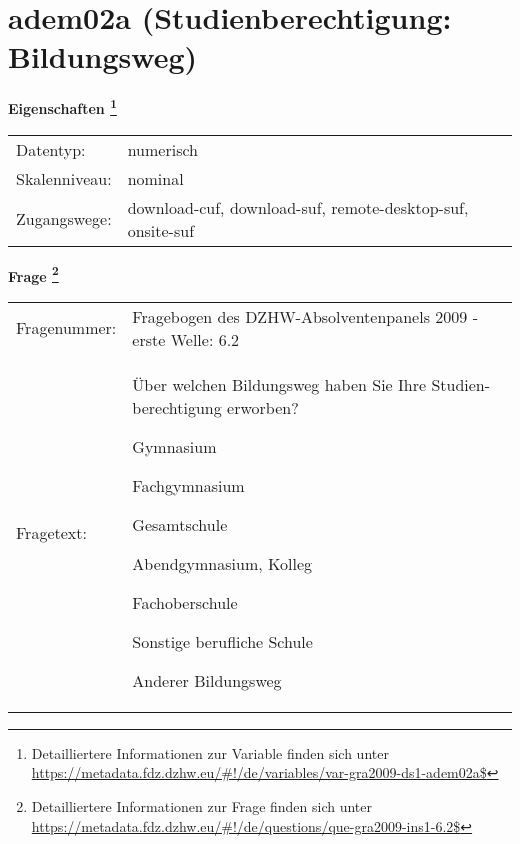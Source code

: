 
    \setcounter{footnote}{0}

    \vspace*{-1.8cm}
	\section{adem02a (Studienberechtigung: Bildungsweg)}
	\label{section:adem02a}



    \vspace*{0.5cm}
    \noindent\textbf{Eigenschaften
	\footnote{Detailliertere Informationen zur Variable finden sich unter
		\url{https://metadata.fdz.dzhw.eu/\#!/de/variables/var-gra2009-ds1-adem02a$}}}\\
	\begin{tabularx}{\hsize}{@{}lX}
	Datentyp: & numerisch \\
	Skalenniveau: & nominal \\
	Zugangswege: &
	  download-cuf, 
	  download-suf, 
	  remote-desktop-suf, 
	  onsite-suf
 \\
    \end{tabularx}



				\vspace*{0.5cm}
                \noindent\textbf{Frage
	                \footnote{Detailliertere Informationen zur Frage finden sich unter
		              \url{https://metadata.fdz.dzhw.eu/\#!/de/questions/que-gra2009-ins1-6.2$}}}\\
				\begin{tabularx}{\hsize}{@{}lX}
					Fragenummer: &
					  Fragebogen des DZHW-Absolventenpanels 2009 - erste Welle:
					  6.2
 \\
					Fragetext: & Über welchen Bildungsweg haben Sie Ihre Studien- berechtigung erworben?\par  Gymnasium\par  Fachgymnasium\par  Gesamtschule\par  Abendgymnasium, Kolleg\par  Fachoberschule\par  Sonstige berufliche Schule\par  Anderer Bildungsweg \\
				\end{tabularx}





